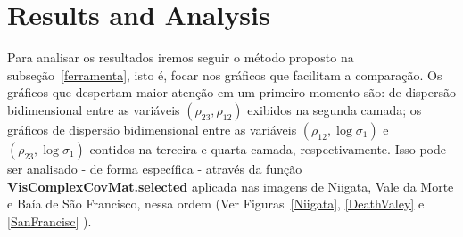 \documentclass[a4paper,12pt]{article}
\begin{document}
\section{Results and Analysis}\label{quatro}

Para analisar os resultados iremos seguir o método proposto na subseção~\ref{ferramenta}, isto é, focar nos gráficos que facilitam a comparação. Os gráficos que despertam maior atenção em um primeiro momento são: de dispersão bidimensional entre as variáveis $(\rho_{23}, \rho_{12})$ exibidos na segunda camada; os gráficos de dispersão bidimensional entre as variáveis $(\rho_{12},\log\sigma_{1})$ e $(\rho_{23},\log\sigma_{1})$ contidos na terceira e quarta camada, respectivamente. Isso pode ser analisado - de forma específica - através da função \textbf{VisComplexCovMat.selected} aplicada nas imagens de Niigata, Vale da Morte e Baía de São Francisco, nessa ordem (Ver Figuras~\ref{Niigata}, \ref{DeathValey} e \ref{SanFrancisc} ).
\end{document}
